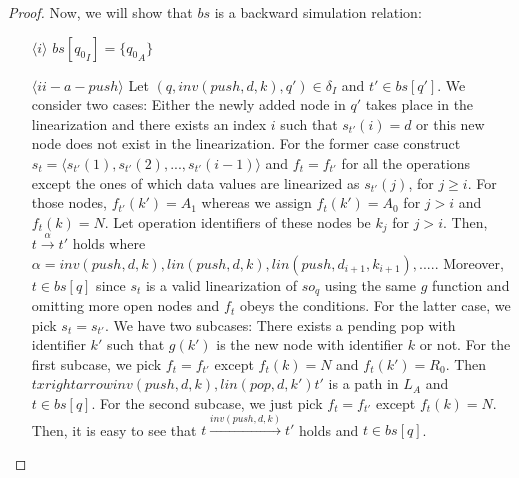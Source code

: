 \begin{proof}
Now, we will show that $bs$ is a backward simulation relation:
\begin{itemize}
\item[$\langle i \rangle$] $bs[{q_0}_I] =\{{q_0}_A\}$
\item[$\langle ii-a-push \rangle$] Let $(q,inv(push,d,k),q') \in \delta_I$ and $t' \in bs[q']$. We consider two cases: Either the newly added node in $q'$ takes place in the linearization and there exists an index $i$ such that $s_{t'}(i) = d$ or this new node does not exist in the linearization. For the former case construct $s_t = \langle s_{t'}(1), s_{t'}(2),..., s_{t'}(i-1) \rangle$ and $f_t = f_{t'}$ for all the operations except the ones of which data values are linearized as $s_{t'}(j)$,  for $j\geq i$. For those nodes, $f_{t'}(k') = A_1$ whereas we assign $f_t(k') = A_0$ for $j>i$ and $f_t(k) = N$. Let operation identifiers of these nodes be $k_j$ for $j>i$. Then, $t \xrightarrow{\alpha} t'$ holds where $\alpha = inv(push,d,k), lin(push,d,k), lin(push,d_{i+1},k_{i+1}),....$. Moreover, $t \in bs[q]$ since $s_t$ is a valid linearization of $so_q$ using the same $g$ function and omitting more open nodes and $f_t$ obeys the conditions. For the latter case, we pick $s_t = s_{t'}$. We have two subcases:  There exists a pending pop with identifier $k'$ such that $g(k')$ is the new node with identifier $k$ or not. For the first subcase, we pick $f_t = f_{t'}$ except $f_t(k) = N$ and $f_t(k') = R_0$. Then $t xrightarrow{inv(push,d,k),lin(pop,d,k')} t'$ is a path in $L_A$ and $t \in bs[q]$. For the second subcase, we just pick $f_t = f_{t'}$ except $f_t(k) = N$. Then, it is easy to see that $t \xrightarrow{inv(push,d,k)} t'$ holds and $t \in bs[q]$. 

\end{itemize}
\end{proof}
